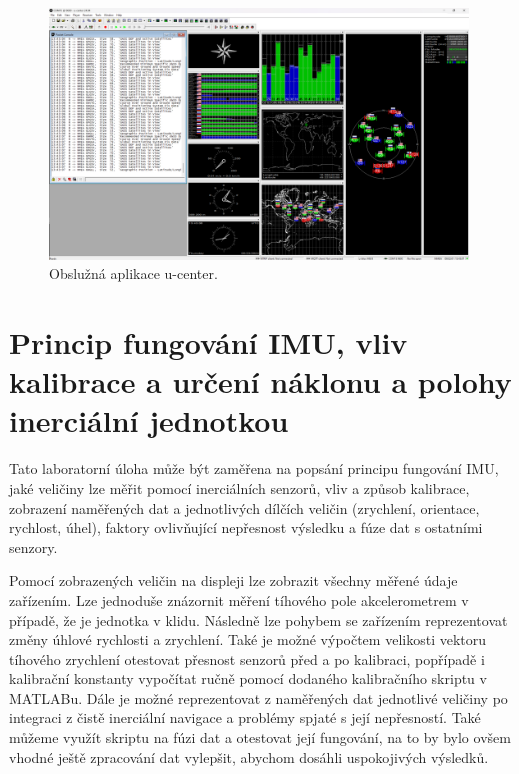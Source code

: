 \begin{figure}[h]
     \centering
         \includegraphics[width=0.99\textwidth]{obrazky/uCenter}
         \caption{Obslužná aplikace u-center.}
        \label{fig:uCenter}
\end{figure}

\section{Princip fungování IMU, vliv kalibrace a určení náklonu a polohy inerciální jednotkou}
Tato laboratorní úloha může být zaměřena na popsání principu fungování IMU, jaké veličiny lze měřit pomocí inerciálních senzorů, vliv a způsob kalibrace, zobrazení naměřených dat a jednotlivých dílčích veličin (zrychlení, orientace, rychlost, úhel), faktory ovlivňující nepřesnost výsledku a fúze dat s ostatními senzory. 

Pomocí zobrazených veličin na displeji lze zobrazit všechny měřené údaje zařízením. Lze jednoduše znázornit měření tíhového pole akcelerometrem v případě, že je jednotka v klidu. Následně lze pohybem se zařízením reprezentovat změny úhlové rychlosti a zrychlení. Také je možné výpočtem velikosti vektoru tíhového zrychlení otestovat přesnost senzorů před a po kalibraci, popřípadě i kalibrační konstanty vypočítat ručně pomocí dodaného kalibračního skriptu v MATLABu. Dále je možné reprezentovat z naměřených dat jednotlivé veličiny po integraci z čistě inerciální navigace a problémy spjaté s její nepřesností. Také můžeme využít skriptu na fúzi dat a otestovat její fungování, na to by bylo ovšem vhodné ještě zpracování dat vylepšit, abychom dosáhli uspokojivých výsledků.

